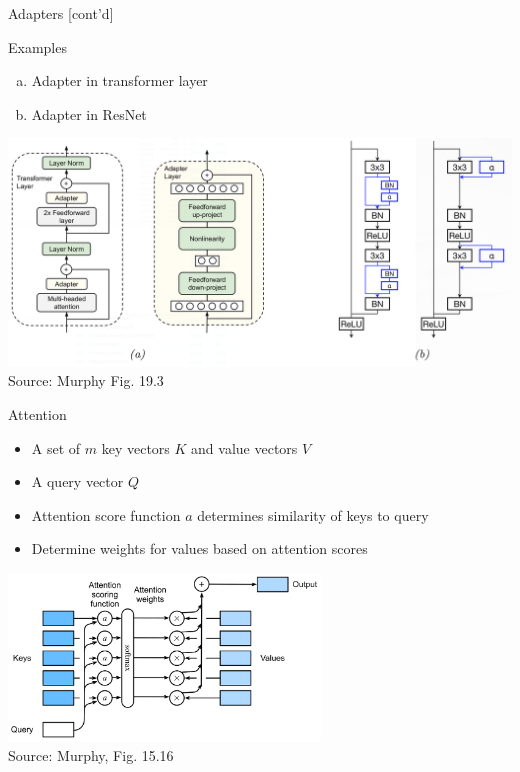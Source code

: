 \documentclass[ignorenonframetext,xcolor=x11names]{beamer}
\begin{document}
\begin{frame}{Adapters \small [cont'd]}
\begin{block}{Examples}
  \begin{enumerate}[(a)]
     \item Adapter in transformer layer
     \item Adapter in ResNet
  \end{enumerate}
\end{block}

\centering
\includegraphics[width=\textwidth]{murphy_19_03.png} \\
\scriptsize Source: Murphy Fig. 19.3 \normalsize
\end{frame}

\begin{frame}{Attention}
\begin{itemize}
  \item A set of $m$ key vectors $K$ and value vectors $V$
  \item A query vector $Q$
  \item Attention score function $a$ determines similarity of keys to query
  \item Determine weights for values based on attention scores
\end{itemize}

\centering
\includegraphics[height=1.75in]{murphy_15_16.png} \\

\scriptsize Source: Murphy, Fig. 15.16 \normalsize
\end{frame}
\end{document}
